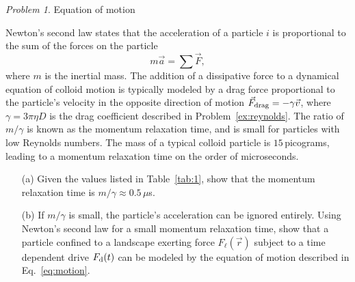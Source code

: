 \documentclass[preprint,showpacs,preprintnumbers,amsmath,amssymb,aps,prb]{revtex4-1}
\theoremstyle{remark}
\newtheorem{problem}{Problem}
\begin{document}
\begin{problem}{Equation of motion}
  \label{ex:n2l}

\noindent Newton's second law states that
  the acceleration of a particle $i$
  is proportional to 
  the sum of the forces on the particle 
  \begin{equation}
  m \vec{a} = \sum \vec{F},
  \label{eq:n2l}
  \end{equation}
  where $m$ is the
  inertial mass.  
  The addition of a dissipative force to a dynamical equation 
  of colloid motion 
  is typically modeled
  by a drag force proportional to the particle's velocity
  in the opposite direction of motion 
  $\vec{F}_{\rm drag} = - \gamma \vec{v}$,
  where $\gamma = 3 \pi \eta D$ is the drag coefficient
  described in Problem~\ref{ex:reynolds}.
  The ratio of $m/\gamma$ is 
  known as the momentum relaxation time,
  and is small for
  particles with low Reynolds numbers.
  The mass of a
  typical colloid particle is $15$\,picograms,
  leading to a momentum relaxation time
  on the order of microseconds.

\begin{enumerate}

\item [(a)] Given  the values listed in Table~\ref{tab:1},
 show that  the momentum relaxation time is 
  $m/\gamma \approx 0.5\,\mu$s. 
  
\item [(b)] If $m/\gamma$ is small, the
  particle's acceleration can be ignored
  entirely.
Using Newton's second law for
  a small momentum relaxation time, 
  show that a particle confined to a landscape exerting force
  $F_\ell(\vec{r})$ subject to a time dependent drive $F_{\rm d}(t)$
  can be modeled by the equation of motion described in 
  Eq.~\eqref{eq:motion}.
  \end{enumerate}
\end{problem}

\end{document}
